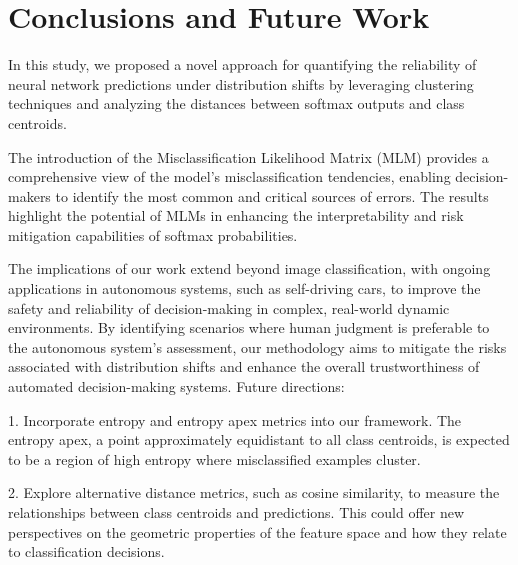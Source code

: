 
\section{Conclusions and Future Work}

In this study, we proposed a novel approach for quantifying the reliability of neural network predictions under distribution shifts by leveraging clustering techniques and analyzing the distances between softmax outputs and class centroids. 

The introduction of the Misclassification Likelihood Matrix (MLM) provides a comprehensive view of the model's misclassification tendencies, enabling decision-makers to identify the most common and critical sources of errors.
The results highlight the potential of MLMs in enhancing the interpretability and risk mitigation capabilities of softmax probabilities.


The implications of our work extend beyond image classification, with ongoing applications in autonomous systems, such as self-driving cars, to improve the safety and reliability of decision-making in complex, real-world dynamic environments. 
By identifying scenarios where human judgment is preferable to the autonomous system's assessment, our methodology aims to mitigate the risks associated with distribution shifts and enhance the overall trustworthiness of automated decision-making systems.
Future directions: 

1. Incorporate entropy and entropy apex metrics into our framework. The entropy apex, a point approximately equidistant to all class centroids, is expected to be a region of high entropy where misclassified examples cluster. 

2. Explore alternative distance metrics, such as cosine similarity, to measure the relationships between class centroids and predictions. This could offer new perspectives on the geometric properties of the feature space and how they relate to classification decisions.

